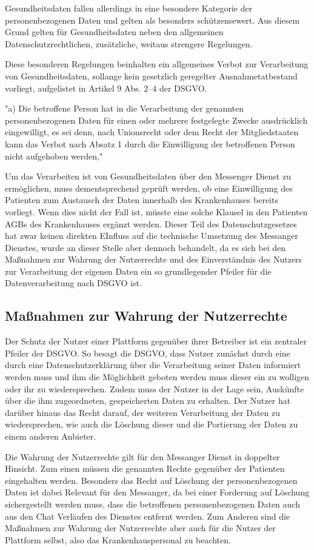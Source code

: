 Gesundheitsdaten fallen allerdings in eine besondere Kategorie der personenbezogenen Daten und gelten als besonders schützensewert. Aus diesem Grund gelten für Gesundheitsdaten neben den allgemeinen Datenschutzrechtlichen, zusätzliche, weitaus strengere Regelungen.

Diese besonderen Regelungen beinhalten ein allgemeines Verbot zur Verarbeitung von Gesundheitsdaten, sollange kein gesetzlich geregelter Ausnahmetatbestand vorliegt, aufgelistet in Artikel 9 Abs. 2–4  der DSGVO.

"a) Die betroffene Person hat in die Verarbeitung der genannten personenbezogenen Daten für einen oder mehrere festgelegte Zwecke ausdrücklich eingewilligt, es sei denn, nach Unionsrecht oder dem Recht der Mitgliedstaaten kann das Verbot nach Absatz 1 durch die Einwilligung der betroffenen Person nicht aufgehoben werden,"

Um das Verarbeiten ist von Gesundheitsdaten über den Messenger Dienst zu ermöglichen, muss dementsprechend geprüft werden, ob eine Einwilligung des Patienten zum Austausch der Daten innerhalb des Krankenhauses bereits vorliegt. Wenn dies nicht der Fall ist, müsste eine solche Klausel in den Patienten AGBs des Krankenhauses ergänzt werden. Dieser Teil des Datenschutzgesetzes hat zwar keinen direkten EInfluss auf die technische Umsetzung des Messanger Dienstes, wurde an dieser Stelle aber dennoch behandelt, da es sich bei den Maßnahmen zur Wahrung der Nutzerrechte und des Einverständnis des Nutzers zur Verarbeitung der eigenen Daten ein so grundlegender Pfeiler für die Datenverarbeitung nach DSGVO ist.

\subsection{Maßnahmen zur Wahrung der Nutzerrechte}\label{subsection:mzwdn}
Der Schutz der Nutzer einer Plattform gegenüber ihrer Betreiber ist ein zentraler Pfeiler der DSGVO. So besagt die DSGVO, dass Nutzer zunächst durch eine durch eine Datenschutzerklärung über die Verarbeitung seiner Daten informiert werden muss und ihm die Möglichkeit geboten werden muss dieser ein zu wolligen oder ihr zu wiedersprechen. Zudem muss der Nutzer in der Lage sein, Auskünfte über die ihm zugeordneten, gespeicherten Daten zu erhalten. Der Nutzer hat darüber hinaus das Recht darauf, der weiteren Verarbeitung der Daten zu wiedersprechen, wie auch die Löschung dieser und die Portierung der Daten zu einem anderen Anbieter.

Die Wahrung der Nutzerrechte gilt für den Messanger Dienst in doppelter Hinsicht. 
Zum einen müssen die genannten Rechte gegenüber der Patienten eingehalten werden. Besonders das Recht auf Löschung der personenbezogenen Daten ist dabei Relevant für den Messanger, da bei einer Forderung auf Löschung sichergestellt werden muss, dass die betroffenen personenbezogenen Daten auch aus den Chat Verläufen des Dienstes entfernt werden. Zum Anderen sind die Maßnahmen zur Wahrung der Nutzerrechte aber auch für die Nutzer der Plattform selbst, also das Krankenhauspersonal zu beachten.

